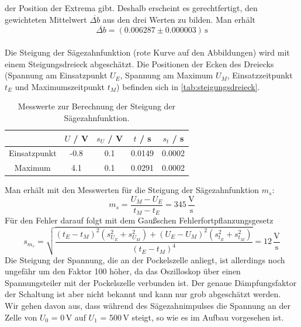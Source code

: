 der Position der Extrema gibt.
Deshalb erscheint es gerechtfertigt,
den gewichteten Mittelwert $\overline{\Delta b}$ aus den drei Werten zu bilden. Man erhält
\begin{equation}
  \overline{\Delta b} = (0.006287 \pm 0.000003)\,\text{s}
\end{equation}
\\[\baselineskip]
Die Steigung der Sägezahnfunktion (rote Kurve auf den Abbildungen) wird mit einem Steigungsdreieck abgeschätzt.
Die Positionen der Ecken des Dreiecks
(Spannung am Einsatzpunkt $U_E$, Spannung am Maximum $U_M$, Einsatzzeitpunkt $t_E$ und Maximumszeitpunkt $t_M$)
befinden sich in \autoref{tab:steigungsdreieck}.
\begin{table}[H]
\caption{Messwerte zur Berechnung der Steigung der Sägezahnfunktion.}
\begin{center}
\begin{tabular}{|c|c|c|c|c|}
  \hline
   				& $U$ / V 	& $s_U$ / V & $t$ / s 	& $s_t$ / s \\ \hline  
 Einsatzpunkt 	& -0.8      & 0.1     	& 0.0149   	& 0.0002       \\ \hline  
 Maximum     	& 4.1      	& 0.1     	& 0.0291    & 0.0002       \\ \hline   
 
\end{tabular}
\end{center}
\label{tab:steigungsdreieck}
\end{table}
Man erhält mit den Messwerten für die Steigung der Sägezahnfunktion $m_s$:
\begin{equation}
  m_s = \frac{U_M-U_E}{t_M-t_E} = 345 \,\frac{\text{V}}{\text{s}}
\end{equation}
Für den Fehler darauf folgt mit dem Gaußschen Fehlerfortpflanzungsgesetz
\begin{equation}
  s_{m_s}=\sqrt{\frac{(t_E-t_M)^2 \left(s_{U_E}^2+s_{U_M}^2\right)+(U_E-U_M)^2 \left(s_{t_E}^2+s_{t_M}^2\right)}{(t_E-t_M)^4}}
  =12\,\frac{\text{V}}{\text{s}}
\end{equation}
Die Steigung der Spannung, die an der Pockelszelle anliegt, ist allerdings noch ungefähr um den Faktor 100 höher,
da das Oszilloskop über einen Spannungsteiler mit der Pockelszelle verbunden ist.
Der genaue Dämpfungsfaktor der Schaltung ist aber nicht bekannt und kann nur grob abgeschätzt werden.\\
Wir gehen davon aus, dass während des Sägezahnimpulses
die Spannung an der Zelle von $U_0$ = 0\,V auf $U_1$ = 500\,V steigt,
so wie es im Aufbau vorgesehen ist.
